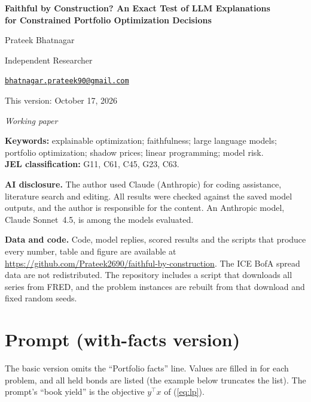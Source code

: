 \documentclass[11pt]{article}
\makeatletter
\newcommand{\authorname}{Prateek Bhatnagar}
\newcommand{\authoremail}{bhatnagar.prateek90@gmail.com}
\newcommand{\codeurl}{\url{https://github.com/Prateek2690/faithful-by-construction}}
\newcommand{\datewritten}{October 17, 2026}
\makeatother
\begin{document}
\thispagestyle{empty}
\begin{center}
{\LARGE\bfseries Faithful by Construction? An Exact Test of LLM Explanations\\[2pt]
for Constrained Portfolio Optimization Decisions\par}
\vspace{1.2em}
{\large \authorname\par}
{\normalsize Independent Researcher\par}
{\small \href{mailto:\authoremail}{\texttt{\authoremail}}\par}
\vspace{0.8em}
{\small This version: \datewritten\par}
{\small\itshape Working paper\par}
\end{center}
\vspace{1em}
\begin{abstract}\noindent\end{abstract}
\vspace{0.6em}
\noindent\textbf{Keywords:} explainable optimization; faithfulness; large language models;
portfolio optimization; shadow prices; linear programming; model risk.\\[0.3em]
\noindent\textbf{JEL classification:} G11, C61, C45, G23, C63.

\vspace{0.8em}
\noindent\textbf{AI disclosure.} The author used Claude (Anthropic) for coding assistance,
literature search and editing. All results were checked against the saved model outputs,
and the author is responsible for the content. An Anthropic model, Claude Sonnet~4.5, is
among the models evaluated.

\vspace{0.4em}
\noindent\textbf{Data and code.} Code, model replies, scored results and the scripts that
produce every number, table and figure are available at \codeurl. The ICE BofA spread data
are not redistributed. The repository includes a script that downloads all series from
FRED, and the problem instances are rebuilt from that download and fixed random seeds.
\newpage
\setcounter{page}{1}


\appendix
\clearpage
\section{Prompt (with-facts version)}
\label{app:prompt}
The basic version omits the ``Portfolio facts'' line. Values are filled in for each
problem, and all held bonds are listed (the example below truncates the list). The
prompt's ``book yield'' is the objective $y^\top x$ of (\ref{eq:lp}).

\end{document}
